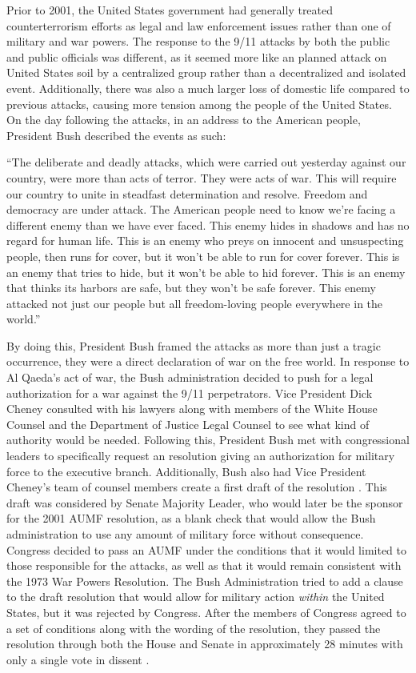 \documentclass[12pt]{article}
\begin{document}
Prior to 2001, the United States government had generally treated counterterrorism efforts as legal and law enforcement issues rather than one of military and war powers.
The response to the 9/11 attacks by both the public and public officials was different, as it seemed more like an planned attack on United States soil by a centralized group rather than a decentralized and isolated event.
Additionally, there was also a much larger loss of domestic life compared to previous attacks, causing more tension among the people of the United States.
On the day following the attacks, in an address to the American people, President Bush described the events as such:

\begin{displayquote}
``The deliberate and deadly attacks, which were carried out yesterday against our country, were more than acts of terror. They were acts of war. This will require our country to unite in steadfast determination and resolve. Freedom and democracy are under attack. The American people need to know we're facing a different enemy than we have ever faced. This enemy hides in shadows and has no regard for human life. This is an enemy who preys on innocent and unsuspecting people, then runs for cover, but it won't be able to run for cover forever. This is an enemy that tries to hide, but it won't be able to hid forever. This is an enemy that thinks its harbors are safe, but they won't be safe forever. This enemy attacked not just our people but all freedom-loving people everywhere in the world.'' \autocite{bush2001}
\end{displayquote}

By doing this, President Bush framed the attacks as more than just a tragic occurrence, they were a direct declaration of war on the free world.
In response to Al Qaeda's act of war, the Bush administration decided to push for a legal authorization for a war against the 9/11 perpetrators.
Vice President Dick Cheney consulted with his lawyers along with members of the White House Counsel and the Department of Justice Legal Counsel to see what kind of authority would be needed.
Following this, President Bush met with congressional leaders to specifically request an resolution giving an authorization for military force to the executive branch.
Additionally, Bush also had Vice President Cheney's team of counsel members create a first draft of the resolution \autocite[176]{murray2015}.
This draft was considered by Senate Majority Leader, who would later be the sponsor for the 2001 AUMF resolution, as a blank check that would allow the Bush administration to use any amount of military force without consequence.
Congress decided to pass an AUMF under the conditions that it would limited to those responsible for the attacks, as well as that it would remain consistent with the 1973 War Powers Resolution.
The Bush Administration tried to add a clause to the draft resolution that would allow for military action \emph{within} the United States, but it was rejected by Congress.
After the members of Congress agreed to a set of conditions along with the wording of the resolution, they passed the resolution through both the House and Senate in approximately 28 minutes with only a single vote in dissent \autocite[177]{murray2015}.


\newpage
{}
\printbibliography[heading=none]{}
\end{document}
